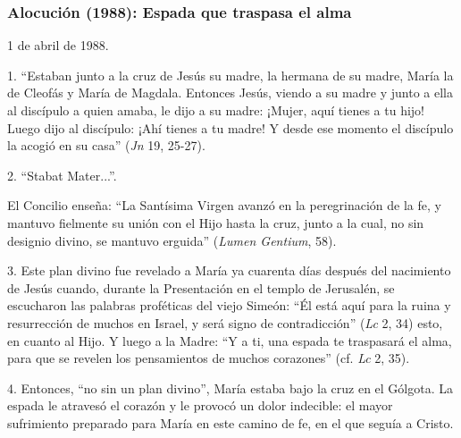			\subsubsection{Alocución (1988): Espada que traspasa el alma}
			
			\begin{referencia}1 de abril de 1988.\end{referencia}
			
			\begin{body}1. “Estaban junto a la cruz de Jesús su madre, la hermana de su madre, María la de Cleofás y María de Magdala. Entonces Jesús, viendo a su madre y junto a ella al discípulo a quien amaba, le dijo a su madre: ¡Mujer, aquí tienes a tu hijo! Luego dijo al discípulo: ¡Ahí tienes a tu madre! Y desde ese momento el discípulo la acogió en su casa” (\textit{Jn} 19, 25-27). \end{body}
			
			\begin{body}2. “Stabat Mater...”. \begin{bodysmall}[Acabamos de recorrer el “Vía Crucis”, a lo largo del cual meditamo<a id="_idTextAnchor025"></a>s sobre el encuentro de la Madre con el Hijo, en la cuarta estación.]\end{bodysmall} El Concilio enseña: “La Santísima Virgen avanzó en la peregrinación de la fe, y mantuvo fielmente su unión con el Hijo hasta la cruz, junto a la cual, no sin designio divino, se mantuvo erguida” (\textit{Lumen Gentium}, 58). \end{body}
			
			\begin{body}3. Este plan divino fue revelado a María ya cuarenta días después del nacimiento de Jesús cuando, durante la Presentación en el templo de Jerusalén, se escucharon las palabras proféticas del viejo Simeón: “Él está aquí para la ruina y resurrección de muchos en Israel, y será signo de contradicción” (\textit{Lc} 2, 34) esto, en cuanto al Hijo. Y luego a la Madre: “Y a ti, una espada te traspasará el alma, para que se revelen los pensamientos de muchos corazones” (cf. \textit{Lc }2, 35). \end{body}
			
			\begin{body}4. Entonces, “no sin un plan divino”, María estaba bajo la cruz en el Gólgota. La espada le atravesó el corazón y le provocó un dolor indecible: el mayor sufrimiento preparado para María en este camino de fe, en el que seguía a Cristo. \end{body}
			
